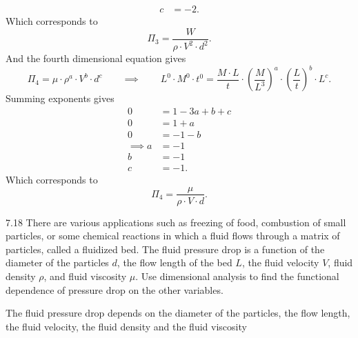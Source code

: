 \begin{derivation}
\begin{align*}
    c &= -2
  .\end{align*}
  Which corresponds to
  \[ 
  \Pi_3 = \frac{W}{\rho \cdot V^2 \cdot d^2}
  .\]
  And the fourth dimensional equation gives
  \[ 
  \Pi_4 = \mu \cdot \rho^a \cdot V^{b} \cdot d ^{c} \qquad \implies \qquad L^{0} \cdot M^{0} \cdot t ^{0} = \frac{M \cdot L}{t} \cdot \left( \frac{M}{L^3} \right)^{a} \cdot \left( \frac{L}{t} \right)^{b} \cdot L^{c}
  .\]
  Summing exponents gives
  \begin{align*}
    0 &= 1 - 3a + b + c \\
    0 &= 1 + a \\
    0 &= -1 - b \\
    \implies a &= -1 \\
    b &= -1 \\
    c &= -1
  .\end{align*}
  Which corresponds to
  \[ 
  \Pi_4 = \frac{\mu}{\rho \cdot V\cdot d}
  .\]
\end{derivation}


\begin{problem}{7.18}
  There are various applications such as freezing of food, combustion of small particles, or some chemical reactions in which a fluid flows through a matrix of particles, called a fluidized bed.
  The fluid pressure drop is a function of the diameter of the particles $d$, the flow length of the bed $L$, the fluid velocity $V$, fluid density $\rho$, and fluid viscosity $\mu$.
  Use dimensional analysis to find the functional dependence of pressure drop on the other variables.
\end{problem}

\begin{assumptions}
  \item The fluid pressure drop depends on the diameter of the particles, the flow length, the fluid velocity, the fluid density and the fluid viscosity
\end{assumptions}

